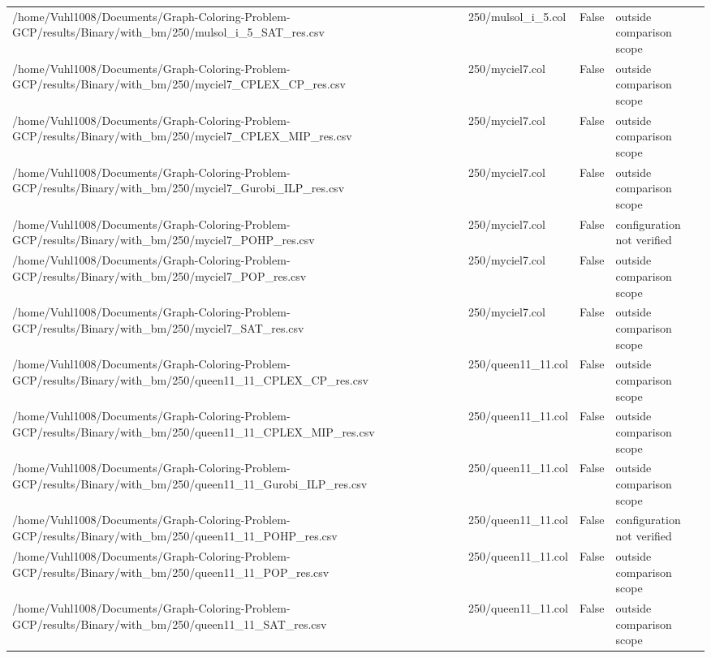 \begin{table}[htbp]
\begin{tabular}{llll}
/home/Vuhl1008/Documents/Graph-Coloring-Problem-GCP/results/Binary/with\_bm/250/mulsol\_i\_5\_SAT\_res.csv & 250/mulsol\_i\_5.col & False & outside comparison scope \\
/home/Vuhl1008/Documents/Graph-Coloring-Problem-GCP/results/Binary/with\_bm/250/myciel7\_CPLEX\_CP\_res.csv & 250/myciel7.col & False & outside comparison scope \\
/home/Vuhl1008/Documents/Graph-Coloring-Problem-GCP/results/Binary/with\_bm/250/myciel7\_CPLEX\_MIP\_res.csv & 250/myciel7.col & False & outside comparison scope \\
/home/Vuhl1008/Documents/Graph-Coloring-Problem-GCP/results/Binary/with\_bm/250/myciel7\_Gurobi\_ILP\_res.csv & 250/myciel7.col & False & outside comparison scope \\
/home/Vuhl1008/Documents/Graph-Coloring-Problem-GCP/results/Binary/with\_bm/250/myciel7\_POHP\_res.csv & 250/myciel7.col & False & configuration not verified \\
/home/Vuhl1008/Documents/Graph-Coloring-Problem-GCP/results/Binary/with\_bm/250/myciel7\_POP\_res.csv & 250/myciel7.col & False & outside comparison scope \\
/home/Vuhl1008/Documents/Graph-Coloring-Problem-GCP/results/Binary/with\_bm/250/myciel7\_SAT\_res.csv & 250/myciel7.col & False & outside comparison scope \\
/home/Vuhl1008/Documents/Graph-Coloring-Problem-GCP/results/Binary/with\_bm/250/queen11\_11\_CPLEX\_CP\_res.csv & 250/queen11\_11.col & False & outside comparison scope \\
/home/Vuhl1008/Documents/Graph-Coloring-Problem-GCP/results/Binary/with\_bm/250/queen11\_11\_CPLEX\_MIP\_res.csv & 250/queen11\_11.col & False & outside comparison scope \\
/home/Vuhl1008/Documents/Graph-Coloring-Problem-GCP/results/Binary/with\_bm/250/queen11\_11\_Gurobi\_ILP\_res.csv & 250/queen11\_11.col & False & outside comparison scope \\
/home/Vuhl1008/Documents/Graph-Coloring-Problem-GCP/results/Binary/with\_bm/250/queen11\_11\_POHP\_res.csv & 250/queen11\_11.col & False & configuration not verified \\
/home/Vuhl1008/Documents/Graph-Coloring-Problem-GCP/results/Binary/with\_bm/250/queen11\_11\_POP\_res.csv & 250/queen11\_11.col & False & outside comparison scope \\
/home/Vuhl1008/Documents/Graph-Coloring-Problem-GCP/results/Binary/with\_bm/250/queen11\_11\_SAT\_res.csv & 250/queen11\_11.col & False & outside comparison scope \\

\end{tabular}
\end{table}
